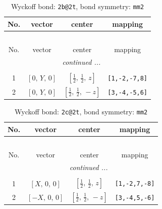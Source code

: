 \documentclass[fleqn,8pt]{jsarticle}
\begin{document}
\renewcommand{\arraystretch}{1.2}
\begin{longtable}{cccc}
\caption{Wyckoff bond: {\tt 2b@2t}, bond symmetry: {\tt mm2}}
 \\
 \hline \hline
No. & vector & center & mapping \\ \hline \endfirsthead

\multicolumn{3}{l}{\tablename\ \thetable{}} \\
 \hline \hline
No. & vector & center & mapping \\ \hline \endhead

 \hline \hline
\multicolumn{3}{r}{\footnotesize\it continued ...} \\ \endfoot

 \hline \hline
\multicolumn{3}{r}{} \\ \endlastfoot

1 & $\left[ 0,\, Y,\, 0 \right]$ & $\left[ \frac{1}{2},\, \frac{1}{2},\, z \right]$ & {\tt [1,-2,-7,8]} \\ \hline
2 & $\left[ 0,\, Y,\, 0 \right]$ & $\left[ \frac{1}{2},\, \frac{1}{2},\, - z \right]$ & {\tt [3,-4,-5,6]} \\
\end{longtable}
\renewcommand{\arraystretch}{1.2}
\begin{longtable}{cccc}
\caption{Wyckoff bond: {\tt 2c@2t}, bond symmetry: {\tt mm2}}
 \\
 \hline \hline
No. & vector & center & mapping \\ \hline \endfirsthead

\multicolumn{3}{l}{\tablename\ \thetable{}} \\
 \hline \hline
No. & vector & center & mapping \\ \hline \endhead

 \hline \hline
\multicolumn{3}{r}{\footnotesize\it continued ...} \\ \endfoot

 \hline \hline
\multicolumn{3}{r}{} \\ \endlastfoot

1 & $\left[ X,\, 0,\, 0 \right]$ & $\left[ \frac{1}{2},\, \frac{1}{2},\, z \right]$ & {\tt [1,-2,7,-8]} \\ \hline
2 & $\left[ - X,\, 0,\, 0 \right]$ & $\left[ \frac{1}{2},\, \frac{1}{2},\, - z \right]$ & {\tt [3,-4,5,-6]} \\
\end{longtable}
\renewcommand{\arraystretch}{1.2}
\end{document}
